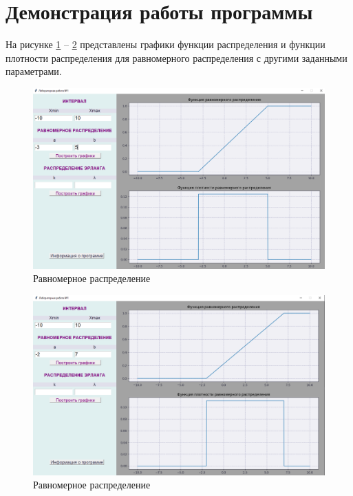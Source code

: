 \section{Демонстрация работы программы}

На рисунке \ref{img:uniformDistr} -- \ref{img:uniformDistr1} представлены графики функции распределения и функции плотности распределения для равномерного распределения с другими заданными параметрами.


\begin{figure}[h]
    \centering
    \includegraphics[scale = 0.44]{img/uniformDistr.png}
    \caption{Равномерное распределение}
    \label{img:uniformDistr}
\end{figure}
\clearpage
\begin{figure}[h]
    \centering
    \includegraphics[scale = 0.44]{img/uniformDistr1.png}
    \caption{Равномерное распределение}
    \label{img:uniformDistr1}
\end{figure}

